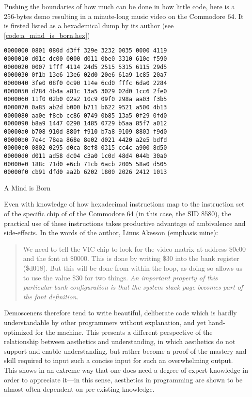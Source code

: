 Pushing the boundaries of how much can be done in how little code, here is a 256-bytes demo resulting in a minute-long music video \citep{akesson_mind_2017} on the Commodore 64. It is firsted listed as a hexademical dump by its author (see \ref{code:a_mind_is_born.hex})

\begin{listing}
  \begin{verbatim}
0000000 0801 080d d3ff 329e 3232 0035 0000 4119
0000010 d01c dc00 0000 d011 0be0 3310 610e f590
0000020 0007 1fff 4114 24d5 2515 5315 6115 29d5
0000030 0f1b 13e6 13e6 02d0 20e6 61a9 1c85 20a7
0000040 3fe0 08f0 0c90 114e 6cd0 fffc 6da0 2284
0000050 d784 4b4a a81c 13a5 3029 02d0 1cc6 2fe0
0000060 11f0 02b0 02a2 10c9 09f0 298a aa03 f3b5
0000070 0a85 ab2d b000 b711 b622 9521 a500 4b13
0000080 aa0e f8cb cc86 0749 0b85 13a5 0f29 0fd0
0000090 b8a9 1447 0290 1485 0729 b5aa 85f7 a012
00000a0 b708 910d 880f f910 b7a8 9109 8803 f9d0
00000b0 7e4c 78ea 868e 8e02 d021 4420 a2e5 bdfd
00000c0 0802 0295 d0ca 8ef8 0315 cc4c a900 8d50
00000d0 d011 ad58 dc04 c3a0 1c0d 48d4 044b 30a0
00000e0 188c 71d0 e6cb 71cb 6acb 2005 58a0 d505
00000f0 cb91 dfd0 aa2b 6202 1800 2026 2412 1013
\end{verbatim}
  \caption{A Mind is Born}
  \label{code:a_mind_is_born.hex}
\end{listing}

Even with knowledge of how hexadecimal instructions map to the instruction set of the specific chip of of the Commodore 64 (in this case, the SID 8580), the practical use of these instructions takes productive advantage of ambivalence and side-effects. In the words of the author, Linus Akesson (emphasis mine):

\begin{quote}
  We need to tell the VIC chip to look for the video matrix at address \$0c00 and the font at \$0000. This is done by writing \$30 into the bank register (\$d018). But this will be done from within the loop, as doing so allows us to use the value \$30 for two things. \emph{An important property of this particular bank configuration is that the system stack page becomes part of the font definition}.
\end{quote}

Demosceners therefore tend to write beautiful, deliberate code which is hardly understandable by other programmers without explanation, and yet hand-optimized for the machine. This presents a different perspective of the relationship between aesthetics and understanding, in which aesthetics do not support and enable understanding, but rather become a proof of the mastery and skill required to input such a concise input for such an overwhelming output. This shows in an extreme way that one does need a degree of expert knowledge in order to appreciate it—in this sense, aesthetics in programming are shown to be almost often dependent on pre-existing knowledge.

